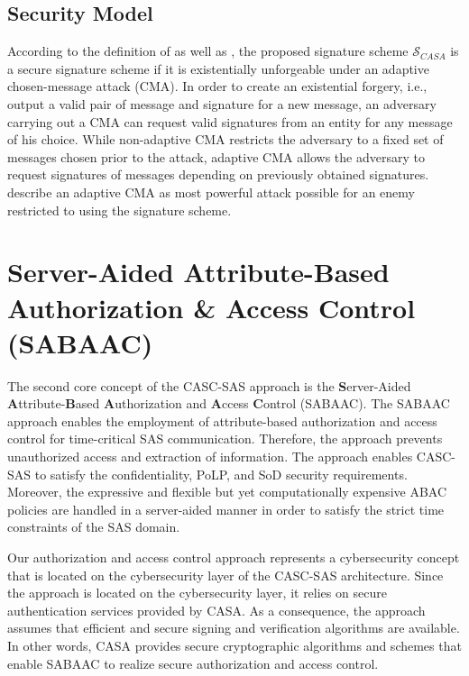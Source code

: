 \subsection{Security Model}
According to the definition of \citeauthor{Boneh2023} \cite{Boneh2023} as well as \citeauthor{Goldwasser1988} \cite{Goldwasser1988}, the proposed signature scheme $\mathcal{S}_{CASA}$ is a secure signature scheme if it is existentially unforgeable under an adaptive chosen-message attack (CMA).
In order to create an existential forgery, i.e., output a valid pair of message and signature for a new message, an adversary carrying out a CMA can request valid signatures from an entity for any message of his choice.
While non-adaptive CMA restricts the adversary to a fixed set of messages chosen prior to the attack, adaptive CMA allows the adversary to request signatures of messages depending on previously obtained signatures.
\citeauthor{Goldwasser1988} describe an adaptive CMA as most powerful attack possible for an enemy restricted to using the signature scheme.

\section{Server-Aided Attribute-Based Authorization \& Access Control (SABAAC)}
\label{sec:approach:sabaac}
The second core concept of the CASC-SAS approach is the \textbf{S}erver-Aided \textbf{A}ttribute-\textbf{B}ased \textbf{A}uthorization and \textbf{A}ccess \textbf{C}ontrol (SABAAC).
The SABAAC approach enables the employment of attribute-based authorization and access control for time-critical SAS communication.
Therefore, the approach prevents unauthorized access and extraction of information.
The approach enables CASC-SAS to satisfy the confidentiality, PoLP, and SoD security requirements.
Moreover, the expressive and flexible but yet computationally expensive ABAC policies are handled in a server-aided manner in order to satisfy the strict time constraints of the SAS domain.

Our authorization and access control approach represents a cybersecurity concept that is located on the cybersecurity layer of the CASC-SAS architecture.
Since the approach is located on the cybersecurity layer, it relies on secure authentication services provided by CASA.
As a consequence, the approach assumes that efficient and secure signing and verification algorithms are available.
In other words, CASA provides secure cryptographic algorithms and schemes that enable SABAAC to realize secure authorization and access control.

